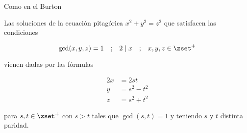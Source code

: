 \iffalse Como en el Burton
\begin{theorem}
  Las soluciones de la ecuación pitagórica $x^2 + y^2 = z^2$ que satisfacen
  las condiciones

  $$ \gcd(x, y, z) = 1 \quad \text{;} \quad 2 \mid x \quad \text{;} \quad x,
  y, z \in \zset^{+} $$

  \noindent vienen dadas por las fórmulas

  \begin{alignat*}{2}
    x &= 2st \\
    y &= s^2 - t^2 \\
    z &= s^2 + t^2
  \end{alignat*}

  \noindent para $s, t \in \zset^{+}$ con $s > t$ tales que $\gcd(s, t) = 1$
  y teniendo $s$ y $t$ distinta paridad.
\end{theorem}

